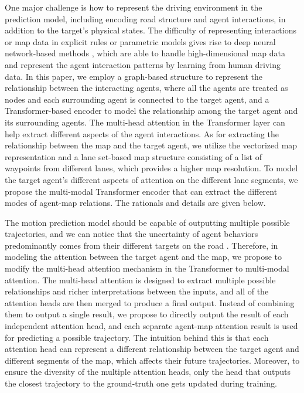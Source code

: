 \documentclass[letterpaper, 10 pt, conference]{ieeeconf}
\begin{document}
One major challenge is how to represent the driving environment in the prediction model, including encoding road structure and agent interactions, in addition to the target's physical states. The difficulty of representing interactions or map data in explicit rules or parametric models gives rise to deep neural network-based methods \cite{mozaffari2020deep}, which are able to handle high-dimensional map data and represent the agent interaction patterns by learning from human driving data. In this paper, we employ a graph-based structure to represent the relationship between the interacting agents, where all the agents are treated as nodes and each surrounding agent is connected to the target agent, and a Transformer-based encoder to model the relationship among the target agent and its surrounding agents. The multi-head attention in the Transformer layer can help extract different aspects of the agent interactions. As for extracting the relationship between the map and the target agent, we utilize the vectorized map representation \cite{gao2020vectornet} and a lane set-based map structure consisting of a list of waypoints from different lanes, which provides a higher map resolution. To model the target agent's different aspects of attention on the different lane segments, we propose the multi-modal Transformer encoder that can extract the different modes of agent-map relations. The rationals and details are given below.


The motion prediction model should be capable of outputting multiple possible trajectories, and we can notice that the uncertainty of agent behaviors predominantly comes from their different targets on the road \cite{zhao2020tnt}. Therefore, in modeling the attention between the target agent and the map, we propose to modify the multi-head attention mechanism in the Transformer to multi-modal attention. The multi-head attention is designed to extract multiple possible relationships and richer interpretations between the inputs, and all of the attention heads are then merged to produce a final output. Instead of combining them to output a single result, we propose to directly output the result of each independent attention head, and each separate agent-map attention result is used for predicting a possible trajectory. The intuition behind this is that each attention head can represent a different relationship between the target agent and different segments of the map, which affects their future trajectories. Moreover, to ensure the diversity of the multiple attention heads, only the head that outputs the closest trajectory to the ground-truth one gets updated during training. 
\end{document}
